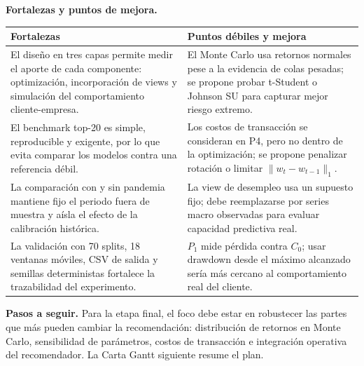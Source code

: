 \noindent\textbf{Fortalezas y puntos de mejora.}
\begin{center}
\small
\setlength{\tabcolsep}{4pt}
\renewcommand{\arraystretch}{1.05}
\begin{tabular}{@{}p{}p{}@{}}
\toprule
\textbf{Fortalezas} & \textbf{Puntos d\'ebiles y mejora} \\
\midrule
El dise\~no en tres capas permite medir el aporte de cada componente: optimizaci\'on, incorporaci\'on de views y simulaci\'on del comportamiento cliente-empresa. & El Monte Carlo usa retornos normales pese a la evidencia de colas pesadas; se propone probar t-Student o Johnson SU para capturar mejor riesgo extremo. \\
El benchmark top-20 es simple, reproducible y exigente, por lo que evita comparar los modelos contra una referencia d\'ebil. & Los costos de transacci\'on se consideran en P4, pero no dentro de la optimizaci\'on; se propone penalizar rotaci\'on o limitar $\|w_t-w_{t-1}\|_1$. \\
La comparaci\'on con y sin pandemia mantiene fijo el periodo fuera de muestra y a\'isla el efecto de la calibraci\'on hist\'orica. & La view de desempleo usa un supuesto fijo; debe reemplazarse por series macro observadas para evaluar capacidad predictiva real. \\
La validaci\'on con 70 splits, 18 ventanas m\'oviles, CSV de salida y semillas deterministas fortalece la trazabilidad del experimento. & $P_1$ mide p\'erdida contra $C_0$; usar drawdown desde el m\'aximo alcanzado ser\'ia m\'as cercano al comportamiento real del cliente. \\
\bottomrule
\end{tabular}
\end{center}

\noindent\textbf{Pasos a seguir.}
Para la etapa final, el foco debe estar en robustecer las partes que m\'as pueden cambiar la recomendaci\'on: distribuci\'on de retornos en Monte Carlo, sensibilidad de par\'ametros, costos de transacci\'on e integraci\'on operativa del recomendador. La Carta Gantt siguiente resume el plan.

